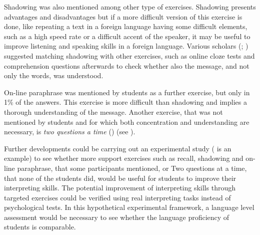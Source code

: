 \documentclass[output=paper]{../langscibook}
\begin{document}
Shadowing was also mentioned among other type of exercises. Shadowing presents advantages and disadvantages \citep{Kurz1992} but if a more difficult version of this exercise is done, like repeating a text in a foreign language having some difficult elements, such as a high speed rate or a difficult accent of the speaker, it may be useful to improve listening and speaking skills in a foreign language. Various scholars (\citealt{Kalina1992};  \citealt{PadillaBenitez2002,Gillies2013,SettonDawrant2016b}) suggested matching shadowing with other exercises, such as online cloze tests and comprehension questions afterwards to check whether also the message, and not only the words, was understood.

On-line paraphrase was mentioned by students as a further exercise, but only in 1\% of the answers. This exercise is more difficult than shadowing and implies a thorough understanding of the message. Another exercise, that was not mentioned by students and for which both concentration and understanding are necessary, is \emph{two questions a time} (\citealt{Kalina1992,Gillies2013}) (see ).

Further developments could be carrying out an experimental study (\citealt{YenkimalekivanHeuven2017} is an example) to see whether more support exercises such as recall, shadowing and on-line paraphrase, that some participants mentioned, or Two questions at a time, that none of the students did, would be useful for students to improve their interpreting skills. The potential improvement of interpreting skills through targeted exercises could be verified using real interpreting tasks instead of psychological tests. In this hypothetical experimental framework, a language level assessment would be necessary to see whether the language proficiency of students is comparable.

\sloppy\printbibliography[heading=subbibliography,notkeyword=this]
\end{document}
